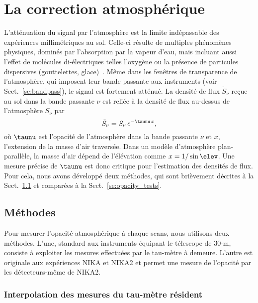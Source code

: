 %
%
\section{La correction atmosphérique}
\label{se:opacity}

L'atténuation du signal par l'atmosphère est la limite indépassable
des expériences millimétriques au sol. Celle-ci résulte de multiples
phénomènes physiques, dominés par l'absorption par la vapeur d'eau,
mais incluant aussi l'effet de molécules di-électriques telles
l'oxygène ou la présence de particules dispersives (gouttelettes,
glace)~\citep{Pardo2002, Pardo2001}. Même dans les fenêtres de
transparence de l'atmosphère, qui imposent leur bande passante aux
instruments (voir Sect.~\ref{se:bandpass}), le signal est fortement
atténué. La densité de
flux $\tilde{S}_\nu$ reçue au sol dans la bande passante $\nu$ est
reliée à la densité de flux au-dessus de l'atmosphère $S_\nu$ par
\begin{equation}
  \tilde{S}_\nu = S_\nu \, e^{-\taunu \, x},
\end{equation}
où $\taunu$ est l'opacité de l'atmosphère dans la bande passante $\nu$
et $x$, l'extension de la masse d'air traversée. Dans un modèle
d'atmosphère plan-parallèle, la masse d'air dépend de l'élévation
comme $x = 1/\sin{\elev}$. Une mesure précise de $\taunu$ est donc
critique pour l'estimation des densités de flux. Pour cela, nous avons
développé deux méthodes, qui sont brièvement décrites à la
Sect.~\ref{se:opacity_methods} et comparées à la
Sect.~\ref{se:opacity_tests}.


\subsection{Méthodes}
\label{se:opacity_methods}

Pour mesurer l'opacité atmosphérique à chaque scans, nous utilisons
deux méthodes. L'une, standard aux instruments équipant le télescope
de 30-m, consiste à exploiter les mesures effectuées par le tau-mètre
à demeure. L'autre est originale aux expériences NIKA et NIKA2 et
permet une mesure de l'opacité par les détecteurs-même de NIKA2.  

\subsubsection{Interpolation des mesures du tau-mètre résident}

